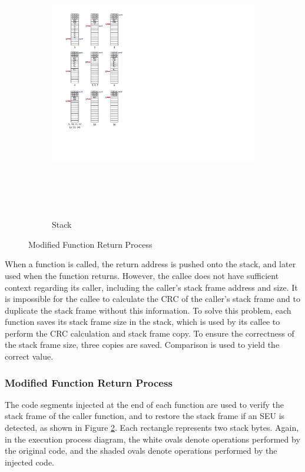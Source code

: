 \begin{figure}[h]
\begin{subfigure}[b]{0.5\columnwidth}
		\includegraphics[width=\textwidth, height=12cm]{figures/modified_function_operations_stack_post_execution_v2}
		\caption{Stack}
		\label{fig:modified_function_operation_stack_post_execution}
	\end{subfigure}
	\vspace{10pt}
	\caption{Modified Function Return Process}\label{fig:modified_function_operation_post_execution}
\end{figure}
When a function is called, the return address is pushed onto the stack, and later used when the function returns. However, the callee does not have sufficient context regarding its caller, including the caller's stack frame address and size. It is impossible for the callee to calculate the CRC of the caller's stack frame and to duplicate the stack frame without this information. To solve this problem, each function saves its stack frame size in the stack, which is used by its callee to perform the CRC calculation and stack frame copy. To ensure the correctness of the stack frame size, three copies are saved. Comparison is used to yield the correct value. 
\vspace{-15pt}
\subsubsection{Modified Function Return Process}
The code segments injected at the end of each function are used to verify the stack frame of the caller function, and to restore the stack frame if an SEU is detected, as shown in Figure \ref{fig:modified_function_operation_post_execution}. Each rectangle represents two stack bytes. Again, in the execution process diagram, the white ovals denote operations performed by the original code, and the shaded ovals denote operations performed by the injected code.

